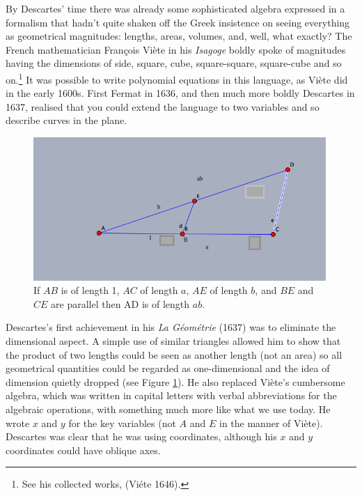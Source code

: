 By Descartes' time there was already some sophisticated algebra expressed in a formalism that hadn't quite shaken off   the Greek insistence on seeing everything as geometrical magnitudes: lengths, areas, volumes, and, well, what exactly? The French mathematician Fran\c{c}ois Vi\`ete in his \emph{Isagoge} boldly spoke of magnitudes having the dimensions of side, square, cube, square-square, square-cube and so on.\footnote{See his collected works, (Vi\'ete 1646).} It was possible to write polynomial equations in this language, as Vi\`ete did in the early 1600s. First Fermat in 1636, and then much more boldly Descartes in 1637, realised that you could extend the language to two variables and so describe curves in the plane.



\bigskip
\begin{center}
    \begin{figure}
   \begin{center}  \includegraphics[width=30em]{Multiplication.png} 
   \end{center}
     \protect \caption{If $AB$ is of length 1, $AC$ of length $a$, $AE$ of length $b$, and $BE$ and $CE$ are parallel then AD is of length $ab.$}
      \label{figmultiplication}
     \end{figure}
\end{center}

\bigskip 


Descartes's first achievement in his \emph{La G\'eom\'etrie} (1637) was to eliminate the dimensional aspect. A simple use of similar triangles allowed him to show that the product of two lengths could be seen as another length (not an area) so all geometrical quantities could be regarded as one-dimensional and the idea of dimension quietly dropped (see Figure \ref{figmultiplication}). He also replaced Vi\`ete's cumbersome algebra, which was written in capital letters with verbal abbreviations for the algebraic operations, with something much more like   what we use today.  He wrote $x$ and $y$ for the key variables (not $A$ and $E$ in the manner of Vi\`ete). Descartes was clear that he was using coordinates, although his $x$ and $y$ coordinates could have oblique axes.


